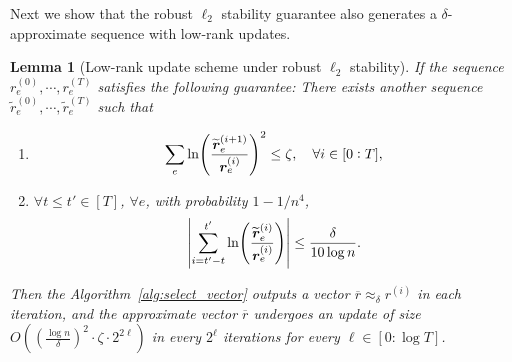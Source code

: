 \documentclass[11pt]{article}
\newtheorem{lemma}[theorem]{Lemma}
\let\originalleft\left
\let\originalright\right
\renewcommand{\left}{\mathopen{}\mathclose\bgroup\originalleft}
\renewcommand{\right}{\aftergroup\egroup\originalright}
\newcommand\rr{\boldsymbol{\mathit{r}}}
\newcommand{\wt}{\widetilde}
\newcommand{\ov}{\overline}
\begin{document}
Next we show that the robust $\ell_2$ stability guarantee also generates a $\delta$-approximate sequence with low-rank updates.
\begin{lemma}[Low-rank update scheme under robust $\ell_2$ stability]\label{lem:LowRankL2Robust}
If the sequence $\rr_e^{(0)}, \cdots, \rr_e^{(T)}$ satisfies the following guarantee: There exists another sequence $\wt{\rr}_e^{(0)}, \cdots, \wt{\rr}_e^{(T)}$ such that
\begin{enumerate}
    \item 
    \[
    \sum_e \ln\left(\frac{\wt{\rr}_e^{(i+1)}}{\rr_e^{(i)}}\right)^2 \leq \zeta, ~~~ \forall i \in [0:T], 
    \]
    \item $\forall t \leq t' \in [T]$, $\forall e$, with probability $1 - 1/n^4$,
    \[
    \left|\sum_{i = t'-t}^{t'} \ln\left(\frac{\wt{\rr}_e^{(i)}}{\rr_e^{(i)}}\right)\right| \leq \frac{\delta}{10 \log n}. 
    \]
\end{enumerate}
Then the Algorithm~\ref{alg:select_vector} outputs a vector $\ov{\rr} \approx_{\delta} \rr^{(i)}$ in each iteration, and the approximate vector $\ov{\rr}$ undergoes an update of size $O((\frac{\log n}{\delta})^2 \cdot \zeta \cdot 2^{2\ell})$ in every $2^\ell$ iterations for every $\ell \in [0:\log T]$.
\end{lemma}
\end{document}
